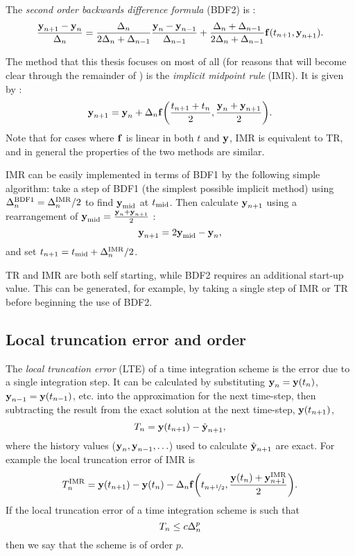 The \emph{second order backwards difference formula} (BDF2) is \cite[715]{GreshoSani}:
\begin{equation}
  \frac{\boldsymbol{\mathrm{y}}_{n+1} - \boldsymbol{\mathrm{y}}_n}{\Delta_{n}} = \frac{\Delta_{n}}{2\Delta_{n} + \Delta_{n-1}} \frac{\boldsymbol{\mathrm{y}}_n - \boldsymbol{\mathrm{y}}_{n-1}}{\Delta_{n-1}}
  + \frac{\Delta_{n} + \Delta_{n-1}}{2\Delta_{n} + \Delta_{n-1}} {\boldsymbol{\mathrm{f}}}(t_{n+1}, \boldsymbol{\mathrm{y}}_{n+1}).
\end{equation}

The method that this thesis focuses on most of all (for reasons that will become clear through the remainder of ) is the \emph{implicit midpoint rule} (IMR).
It is given by \cite[263]{GreshoSani}:
\begin{equation}
  \label{eq:imr-definition}
  \boldsymbol{\mathrm{y}}_{n+1} = \boldsymbol{\mathrm{y}}_n + \Delta_{n} {\boldsymbol{\mathrm{f}}{\left( \frac{t_{n+1} + t_n}{2}, \frac{\boldsymbol{\mathrm{y}}_n + \boldsymbol{\mathrm{y}}_{n+1}}{2} \right)}}.
\end{equation}
Note that for cases where ${\boldsymbol{\mathrm{f}}}$ is linear in both $t$ and $\boldsymbol{\mathrm{y}}$, IMR is equivalent to TR, and in general the properties of the two methods are similar.

IMR can be easily implemented in terms of BDF1 by the following simple algorithm: take a step of BDF1 (the simplest possible implicit method) using $\Delta_{n}^{\mathrm{BDF1}} = \Delta_{n}^{\mathrm{IMR}}/2$ to find $\boldsymbol{\mathrm{y}}_{\mathrm{mid}}$ at $t_{\mathrm{mid}}$.
Then calculate $\boldsymbol{\mathrm{y}}_{n+1}$ using a rearrangement of $\boldsymbol{\mathrm{y}}_{\mathrm{mid}} = \frac{\boldsymbol{\mathrm{y}}_n + \boldsymbol{\mathrm{y}}_{n+1}}{2}$ \cite{Malidi2005}:
\begin{equation}
    \boldsymbol{\mathrm{y}}_{n+1} = 2\boldsymbol{\mathrm{y}}_{\mathrm{mid}} - \boldsymbol{\mathrm{y}}_n,
\end{equation}
and set $t_{n+1} = t_{\mathrm{mid}} + \Delta_{n}^{\mathrm{IMR}}/2$.

TR and IMR are both self starting, while BDF2 requires an additional start-up value.
This can be generated, for example, by taking a single step of IMR or TR before beginning the use of BDF2.


\subsection{Local truncation error and order}
\label{sec:deriv-local-trunc}

The \emph{local truncation error} (LTE) of a time integration scheme is the error due to a single integration step.
It can be calculated by substituting $\boldsymbol{\mathrm{y}}_n = \boldsymbol{\mathrm{y}}(t_n)$, $\boldsymbol{\mathrm{y}}_{n-1} = \boldsymbol{\mathrm{y}}(t_{n-1})$, etc. into the approximation for the next time-step, then subtracting the result from the exact solution at the next time-step, $\boldsymbol{\mathrm{y}}(t_{n+1})$, \ie
\begin{equation}
  \label{eq:60}
  T_n = \boldsymbol{\mathrm{y}}(t_{n+1}) - \hat{\boldsymbol{\mathrm{y}}}_{n+1},
\end{equation}
where the history values ($\boldsymbol{\mathrm{y}}_{n}, \boldsymbol{\mathrm{y}}_{n-1}, \ldots$) used to calculate $\hat{\boldsymbol{\mathrm{y}}}_{n+1}$ are exact.
For example the local truncation error of IMR is
\begin{equation}
  T_n^{\mathrm{IMR}} =  \boldsymbol{\mathrm{y}}(t_{n+1}) - \boldsymbol{\mathrm{y}}(t_n) - \Delta_{n} {\boldsymbol{\mathrm{f}}{\left( t_{n+\nicefrac{1}{2}}, \frac{\boldsymbol{\mathrm{y}}(t_n) + \boldsymbol{\mathrm{y}}_{n+1}^{\mathrm{IMR}}}{2} \right)}}.
  \label{eq:trunc-start}
\end{equation}
If the local truncation error of a time integration scheme is such that
\begin{equation}
  T_n \leq c \Delta_{n}^p
\end{equation}
then we say that the scheme is of order $p$.

